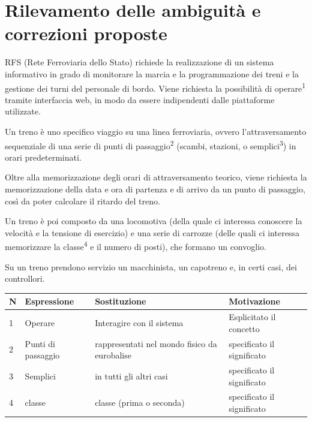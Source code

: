 \documentclass[a4paper,12pt]{report}
\begin{document}
	\section{Rilevamento delle ambiguità e correzioni proposte}
	\par RFS (Rete Ferroviaria dello Stato) richiede la realizzazione di un sistema informativo in grado di monitorare la marcia e la programmazione dei treni e la gestione dei turni del personale di bordo. Viene richiesta la possibilità di operare\textsuperscript{1} tramite interfaccia web, in modo da essere indipendenti dalle piattaforme utilizzate.
	\par Un treno è uno specifico viaggio su una linea ferroviaria, ovvero l'attraversamento sequenziale di una serie di punti di passaggio\textsuperscript{2} (scambi, stazioni, o semplici\textsuperscript{3}) in orari predeterminati.
	\par Oltre alla memorizzazione degli orari di attraversamento teorico, viene richiesta la memorizzazione della data e ora di partenza e di arrivo da un punto di passaggio, così da poter calcolare il ritardo del treno.
	\par Un treno è poi composto da una locomotiva (della quale ci interessa conoscere la velocità e la tensione di esercizio) e una serie di carrozze (delle quali ci interessa memorizzare la classe\textsuperscript{4} e il numero di posti), che formano un convoglio.
	\par Su un treno prendono servizio un macchinista, un capotreno e, in certi casi, dei controllori.

	\begin{tabular}{|p{1cm}|p{3cm}|p{4cm}|p{4cm}|}
		\hline
		\textbf{N} & \textbf{Espressione} & \textbf{Sostituzione} & \textbf{Motivazione} \\ \hline
		1 & Operare & Interagire con il sistema & Esplicitato il concetto  \\ \hline
		2 & Punti di passaggio & rappresentati nel mondo fisico da eurobalise & specificato il significato \\ \hline
		3 & Semplici & in tutti gli altri casi & specificato il significato \\ \hline
		4 & classe & classe (prima o seconda) & specificato il significato \\ \hline
	\end{tabular}
\end{document}
